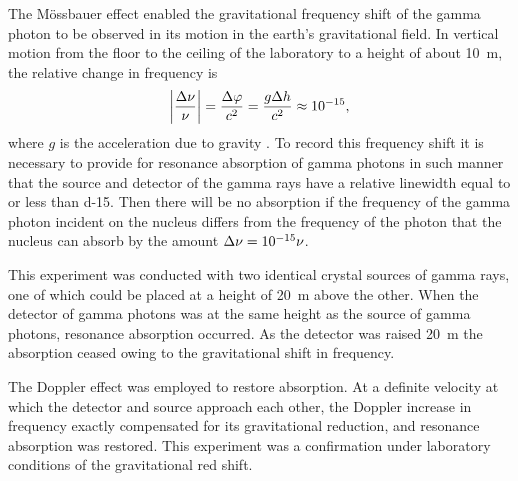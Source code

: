The M\"ossbauer effect enabled the gravitational frequency 
shift of the gamma photon to be observed in its motion in the earth's gravitational field. In vertical motion from the floor to the ceiling of the laboratory to a height of about \SI{10}{\meter}, the relative change in frequency is
\begin{equation*}%
\abs{\frac{\Delta \nu}{ \nu}} = \frac{\Delta \varphi}{c^{2}} = \frac{g \Delta h}{c^{2}} \approx \num{d-15}, 
\end{equation*}
where $g$ is the acceleration due to gravity . To record this frequency shift it is necessary to provide for resonance absorption of gamma photons in such manner that the source and detector of the gamma rays have a relative linewidth equal to or less than \num{d-15}. Then there will be no absorption if the frequency of the gamma photon incident on the nucleus differs from the frequency of the photon that the nucleus can absorb by the amount $\Delta \nu = \num{d-15} \nu$.

This experiment was conducted with two identical crystal
sources of gamma rays, one of which could be placed at a height of \SI{20}{\meter} above the other. When the detector of gamma photons was at the same height as the source of gamma photons, resonance absorption occurred. As the detector was raised \SI{20}{\meter} the absorption ceased owing to the gravitational shift in frequency.

The Doppler effect  was employed to restore absorption. At a definite velocity at which the detector and source approach each other, the Doppler increase in frequency exactly compensated for its gravitational reduction, and resonance absorption was restored. This experiment was a confirmation under laboratory conditions of the gravitational red shift.

